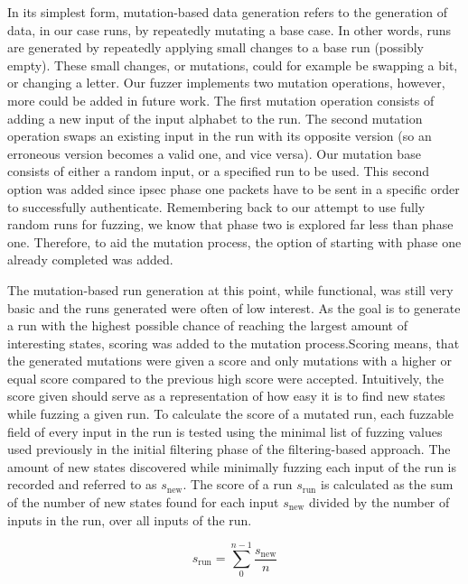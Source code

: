 In its simplest form, mutation-based data generation refers to the generation of data, in our case runs, by repeatedly mutating a base case. In other words, runs are generated by repeatedly applying small changes to a base run (possibly empty). These small changes, or mutations, could for example be swapping a bit, or changing a letter. Our fuzzer implements two mutation operations, however, more could be added in future work. The first mutation operation consists of adding a new input of the input alphabet to the run. The second mutation operation swaps an existing input in the run with its opposite version (so an erroneous version becomes a valid one, and vice versa). Our mutation base consists of either a random input, or a specified run to be used. This second option was added since \ac{ipsec} phase one packets have to be sent in a specific order to successfully authenticate. Remembering back to our attempt to use fully random runs for fuzzing, we know that phase two is explored far less than phase one. Therefore, to aid the mutation process, the option of starting with phase one already completed was added.

The mutation-based run generation at this point, while functional, was still very basic and the runs generated were often of low interest. As the goal is to generate a run with the highest possible chance of reaching the largest amount of interesting states, scoring was added to the mutation process.Scoring means, that the generated mutations were given a score and only mutations with a higher or equal score compared to the previous high score were accepted. Intuitively, the score given should serve as a representation of how easy it is to find new states while fuzzing a given run. To calculate the score of a mutated run, each fuzzable field of every input in the run is tested using the minimal list of fuzzing values used previously in the initial filtering phase of the filtering-based approach. The amount of new states discovered while minimally fuzzing each input of the run is recorded and referred to as $s_\mathrm{new}$. The score of a run $s_\mathrm{run}$ is calculated as the sum of the number of new states found for each input $s_\mathrm{new}$ divided by the number of inputs in the run, over all inputs of the run.

\begin{equation}s_\mathrm{run} = \sum_{0}^{n-1} \frac{s_\mathrm{new}}{n} \end{equation} \label{eq:scoring}

